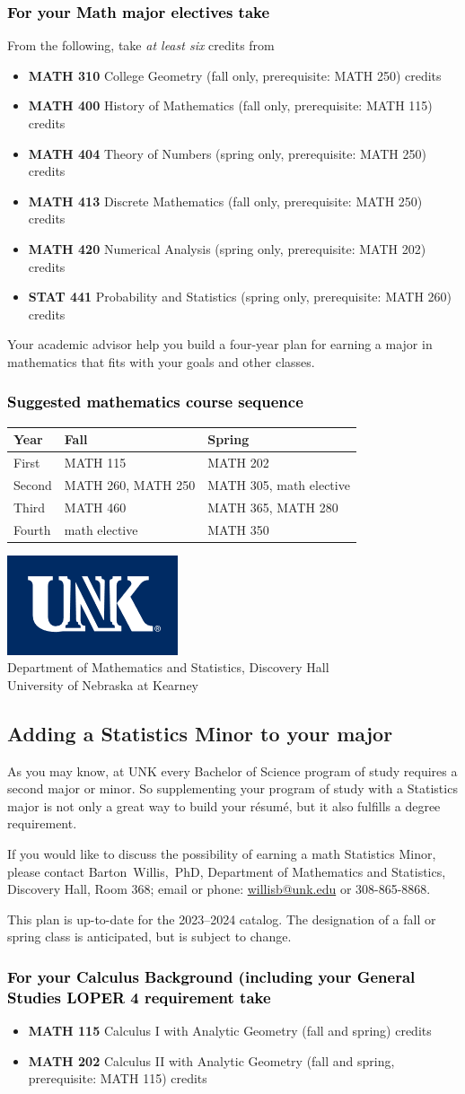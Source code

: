 \documentclass[11pt]{article}
\makeatletter
\newcommand{\calcone}{\textbf{MATH 115} Calculus I with Analytic Geometry (fall and spring) \dotfill 5 credits}
\newcommand{\calconeshort}{MATH 115}
\newcommand{\calctwo}{\textbf{MATH 202} Calculus II with Analytic Geometry (fall and spring, prerequisite: MATH 115) \dotfill 5 credits }
\newcommand{\calctwoshort}{MATH 202}
\newcommand{\foundationsshort}{MATH 250}
\newcommand{\calcthreeshort}{MATH 260}
\newcommand{\linearshort}{MATH 280}
\newcommand{\discrete}{\textbf{MATH 413} Discrete Mathematics  (fall only, prerequisite: MATH 250)\dotfill 3 credits}
\newcommand{\statistics}{\textbf{STAT 441} Probability and Statistics (spring only, prerequisite: MATH 260)  \dotfill  3 credits}
\newcommand{\diffeqshort}{MATH 305}
\newcommand{\abstractalgebrashort}{MATH 350}
\newcommand{\complexshort}{MATH 365}
\newcommand{\advancedcalcshort}{MATH 460}
\newcommand{\numerical}{\textbf{MATH 420}   Numerical Analysis   (spring only, prerequisite: MATH 202)\dotfill 3 credits}
\newcommand{\collegegeometry}{\textbf{MATH 310}	College Geometry (fall only,  prerequisite: MATH 250) \dotfill 3 credits}
\newcommand{\mathhistory}{\textbf{MATH 400} History of Mathematics (fall only,  prerequisite: MATH 115) \dotfill 3 credits}
\newcommand{\numbertheory}{\textbf{MATH 404} Theory of Numbers (spring only,  prerequisite: MATH 250) \dotfill 3 credits}
\newcommand{\contactbw}{\mbox{Barton Willis, PhD}, Department of Mathematics and Statistics,  Discovery Hall, Room 368;
email or phone: \href{mailto:willisb@unk.edu}{willisb@unk.edu} or 308-865-8868.}
\newcommand{\forinfo}[2]{If you would like to discuss the possibility of earning a math {#1}, please contact \contactbw}
\newcommand{\catalog}{2023--2024 }
\newcommand{\LOPER}{LOPER\xspace}
\newcommand{\uptodate}{This plan is up-to-date for  the \catalog catalog. The designation of a fall or spring class is 
anticipated, but  is subject to change.}
\newcommand{\myheading}{
\begin{flushleft}
\includegraphics[scale=0.35]{unk-logo}\\
\setcounter{footnote}{0}
\vspace{0.25in}
 \textcolor{unkblue}{Department of Mathematics and Statistics, Discovery Hall} \\
  \textcolor{unkblue}{University of Nebraska at Kearney}
\end{flushleft}}
\newcommand{\mathBS}{
     \begin{center}
         \begin{tabular}[h]{| l | l | l|} 
            \hline
            \textbf{Year}           & \textbf{Fall}         &  \textbf{Spring}  \\ \hline 
            First & \calconeshort{}  & \calctwoshort \\  \hline
            Second &  \calcthreeshort{}, \foundationsshort & \diffeqshort, math elective \\ \hline
            Third & \advancedcalcshort              &  \complexshort{}, \linearshort \\ \hline
            Fourth & math elective &  \abstractalgebrashort  \\ \hline
         \end{tabular}
\end{center}}
\makeatother
\begin{document}
\subsubsection*{\textcolor{black}{For your Math major electives take}}
From the following, take \emph{at least six} credits from
\begin{itemize}
\item \collegegeometry
\item \mathhistory
\item \numbertheory
\item \discrete
\item \numerical
\item \statistics
\end{itemize}
\vspace{0.0in}
\noindent Your academic advisor help you build a four-year plan for earning a 
major in mathematics that fits with your goals and other classes.

\subsubsection*{\textcolor{black}{Suggested mathematics course sequence}}

\mathBS

\newpage 
\myheading
\subsection*{\textbf{\textcolor{unkblue}{Adding a Statistics Minor to your major}}}



As you may know, at UNK every Bachelor of Science program of study requires a second
major or minor. So supplementing your  program of study with a Statistics major is not only a great
way to build your r\'esum\'e, but it also fulfills a degree requirement.

\forinfo{Statistics Minor}{}

\uptodate

\vspace{-0.1in}

\subsubsection*{\textcolor{black}{For your Calculus Background (including your General Studies \LOPER 4 requirement take}}
\begin{itemize}
\item  \calcone
\item \calctwo
\end{itemize}
\end{document}
